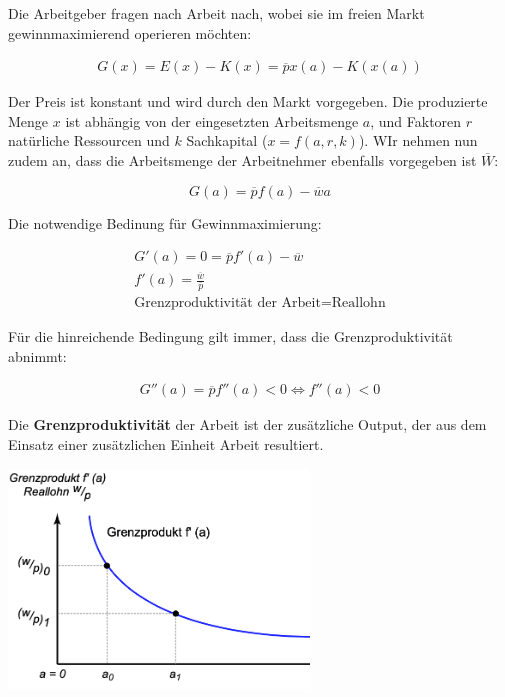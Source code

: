 \documentclass[9pt, landscape, fleqn]{scrartcl}
\begin{document}
\begin{multicols*}{3}
Die Arbeitgeber fragen nach Arbeit nach, wobei sie im freien Markt gewinnmaximierend operieren möchten:

\begin{align}
    G(x) = E(x) - K(x) = \overline{p} x(a) - K(x(a))
\end{align}

Der Preis ist konstant und wird durch den Markt vorgegeben. Die produzierte Menge $x$ ist abhängig von der eingesetzten Arbeitsmenge $a$, und Faktoren $r$ natürliche Ressourcen und $k$ Sachkapital ($x = f(a,r,k)$). WIr nehmen nun zudem an, dass die Arbeitsmenge der Arbeitnehmer ebenfalls vorgegeben ist $\overline{W}$:

\begin{equation}
    G(a) = \overline{p} f(a) - \overline{w} a
\end{equation}

Die notwendige Bedinung für Gewinnmaximierung:

\begin{align}
    G'(a) = 0 = \overline{p} f'(a) - \overline{w} \\
    f'(a) = \frac{\overline{w}}{\overline{p}} \\
    \text{Grenzproduktivität der Arbeit} = \text{Reallohn}
\end{align}

Für die hinreichende Bedingung gilt immer, dass die Grenzproduktivität abnimmt: 

\begin{align}
    G''(a) = \overline{p}f''(a) < 0 \Leftrightarrow f''(a) < 0
\end{align}

Die \textbf{Grenzproduktivität} der Arbeit ist der zusätzliche Output, der aus dem Einsatz einer zusätzlichen Einheit Arbeit resultiert.

\begin{center}
    \includegraphics[width=8cm]{Grenzprodukt.png}
\end{center}


\end{multicols*}
\end{document}
